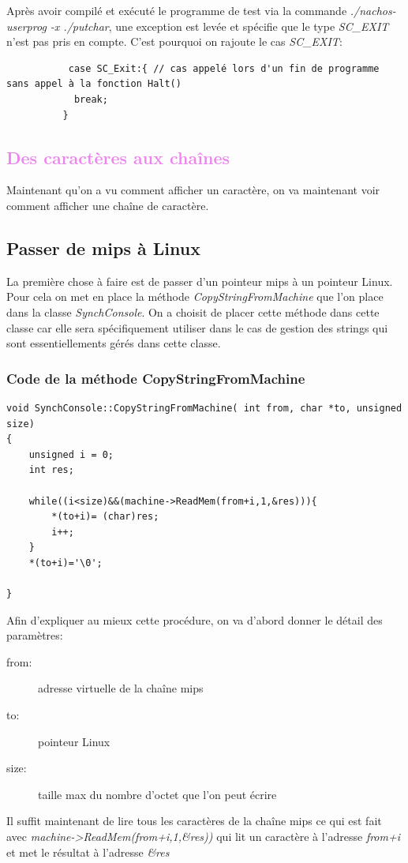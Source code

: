 \documentclass[a4paper,10pt]{article}
\begin{document}
Après avoir compilé et exécuté le programme de test via la commande \emph{./nachos-userprog -x ./putchar}, une exception est levée et spécifie que le type
\emph{SC\_EXIT} n'est pas pris en compte. C'est pourquoi on rajoute le cas \emph{SC\_EXIT}:
\begin{lstlisting}
           case SC_Exit:{ // cas appelé lors d'un fin de programme sans appel à la fonction Halt()
            break;
          }
\end{lstlisting}
\newpage
  \textcolor{Violet}{\section{Des caractères aux chaînes}}
  Maintenant qu'on a vu comment afficher un caractère, on va maintenant voir comment afficher une chaîne de caractère. 
  \textcolor{NavyBlue}{\subsection{Passer de mips à Linux}}
  La première chose à faire est de passer d'un pointeur mips à un pointeur Linux. Pour cela on met en place la méthode \emph{CopyStringFromMachine} que l'on place
  dans la classe \emph{SynchConsole}. On a choisit de placer cette méthode dans cette classe car elle sera spécifiquement utiliser dans le cas de gestion 
  des strings qui sont essentiellements gérés dans cette classe.
  \textcolor{TealBlue}{\subsubsection*{Code de la méthode CopyStringFromMachine}}
  \begin{lstlisting}
void SynchConsole::CopyStringFromMachine( int from, char *to, unsigned size)
{
	unsigned i = 0;
	int res;

	while((i<size)&&(machine->ReadMem(from+i,1,&res))){
		*(to+i)= (char)res;
		i++;
	}
	*(to+i)='\0';

}   
  \end{lstlisting}
  Afin d'expliquer au mieux cette procédure, on va d'abord donner le détail des paramètres:
 \begin{description}
  \item[from:] adresse virtuelle de la chaîne mips
  \item[to:] pointeur Linux
  \item[size:] taille max du nombre d'octet que l'on peut écrire
 \end{description}
 Il suffit maintenant de lire tous les caractères de la chaîne mips ce qui est fait avec \emph{machine->ReadMem(from+i,1,\&res))} qui lit un caractère à l'adresse
 \emph{from+i} et met le résultat à l'adresse \emph{\&res}
 
\end{document}
